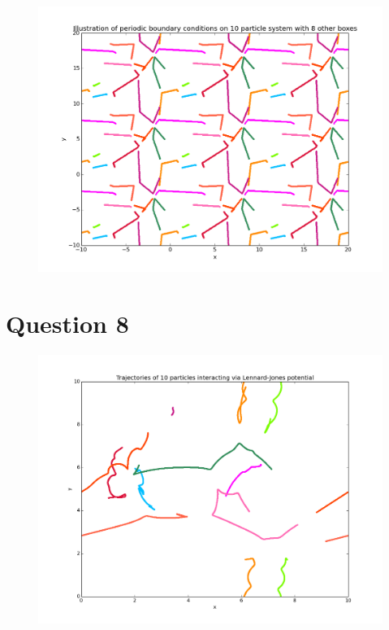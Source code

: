 \documentclass[a4paper,12pt]{article}
\begin{document}
\begin{figure}[H]
\centering
\includegraphics[width = \linewidth]{lab6q7additional.png}
\caption{}
\label{fig:q7i}
\end{figure}

\section{Question 8}

\begin{figure}[H]
\centering
\includegraphics[width = \linewidth]{lab6q8.png}
\caption{}
\label{fig:q8}
\end{figure}
\end{document}
